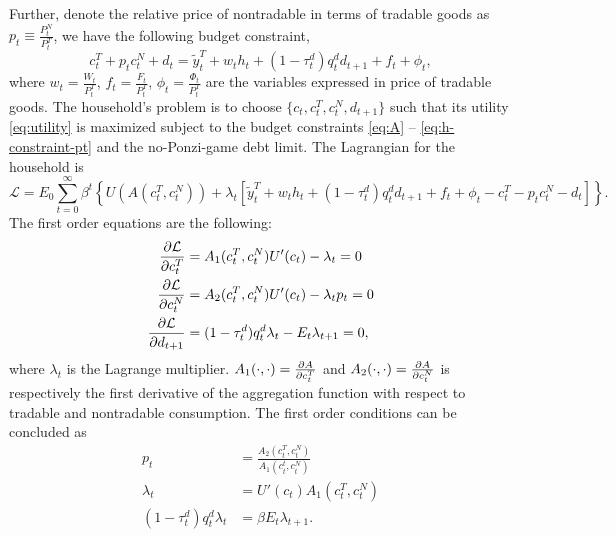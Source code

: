 Further, denote the relative price of nontradable in terms of tradable goods as $p_t \equiv \frac{P^N_t}{P^T_t}$, we have the following budget constraint,
\begin{equation}
    \label{eq:h-constraint-pt}
    c^T_t + p_t c^N_t +  d_t =
     \tilde{y}^T_t + w_t h_t + (1- \tau^d_t) q^d_t d_{t+1} + f_t + \phi_t,
\end{equation}
where $w_t = \frac{W_t}{P^T_t}$, $f_t = \frac{F_t}{P^T_t}$, $\phi_t = \frac{\Phi_t}{P^T_t}$ are the variables expressed in price of tradable goods.
The household's problem is to choose $\{c_t, c_t^T, c_t^N, d_{t+1}\}$ such that its utility \eqref{eq:utility} is maximized subject to the budget constraints \eqref{eq:A} -- \eqref{eq:h-constraint-pt} and the no-Ponzi-game debt limit. The Lagrangian for the household is
\begin{equation*}
    \mathcal{L} = E_0 \sum_{t=0}^\infty \beta^t \left\{
        U(A(c^T_t, c^N_t)) + \lambda_t \left[
            \tilde{y}^T_t + w_t h_t + (1- \tau^d_t) q^d_t d_{t+1} + f_t + \phi_t -
            c^T_t - p_t c^N_t -  d_t
         \right]
     \right\}.
\end{equation*}
The first order equations are the following:
\begin{align*}
    \pdv{\mathcal{L}}{c^T_t} &= A_1(c^T_t, c^N_t) U'(c_t) - \lambda_t = 0\\
    \pdv{\mathcal{L}}{c^N_t} &= A_2 (c^T_t, c^N_t) U'(c_t) - \lambda_t p_t = 0 \\
    \pdv{\mathcal{L}}{d_{t+1}} &= (1 - \tau^d_t)q^d_t \lambda_{t} - E_{t} \lambda_{t+1} = 0,
\end{align*}
where $\lambda_t$ is the Lagrange multiplier.
$A_1(\cdot, \cdot) = \pdv{A}{c^T_t}$ and $A_2(\cdot, \cdot) = \pdv{A}{c^N_t}$ is respectively the first derivative of the aggregation function with respect to tradable and nontradable consumption.
The first order conditions can be concluded as
\begin{subequations}
    \begin{align}
        p_t &= \frac{A_2(c_t^T, c_t^N)}{A_1(c_t^t, c_t^N)} \label{eq:FOC-HH-1} \\
        \lambda_t &= U'(c_t)A_1(c_t^T, c_t^N)\\
        (1-\tau_t^d)q_t^d \lambda_t &= \beta E_t \lambda_{t+1}.
    \end{align}
\end{subequations}